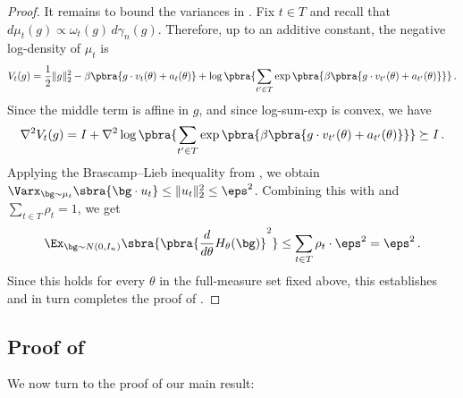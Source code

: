 \documentclass[11pt]{article}
\begin{document}
\begin{proof}
	It remains to bound the variances in .
	Fix $t\in T$ and recall that $d\mu_t(g) \propto \omega_t(g)\, d\gamma_n(g)$. 
	Therefore, up to an additive constant, the negative log-density of $\mu_t$ is
	\[
		V_t(g)
		=
		\frac12\|g\|_2^2
		-
		\beta\pbra{g\cdot v_t(\theta)+a_t(\theta)}
		+
		\log\pbra{
		\sum_{t'\in T}
		\exp\pbra{\beta\pbra{g\cdot v_{t'}(\theta)+a_{t'}(\theta)}}
		}\,.
	\]
	Since the middle term is affine in $g$, and since log-sum-exp is convex, we have
	\[
		\nabla^2 V_t(g)
		=
		I
		+
		\nabla^2
		\log\pbra{
		\sum_{t'\in T}
		\exp\pbra{\beta\pbra{g\cdot v_{t'}(\theta)+a_{t'}(\theta)}}
		}
		\succeq I\,.
	\]
	Applying the Brascamp--Lieb inequality from , we obtain
	$
		\Varx_{\bg\sim\mu_t}\sbra{\bg\cdot u_t}
		\leq
		\|u_t\|_2^2
		\leq
		\eps^2
	$.
	Combining this with  and $\sum_{t\in T}\rho_t=1$, we get
	\[
		\Ex_{\bg\sim N(0,I_n)}
		\sbra{
		\pbra{\frac{d}{d\theta}H_\theta(\bg)}^2
		}
		\leq 
		\sum_{t\in T}\rho_t \cdot \eps^2
		=
		\eps^2\,.
	\]
	Since this holds for every $\theta$ in the full-measure set fixed above, this establishes  and in turn completes the proof of . 
\end{proof} 

\subsection{Proof of~}
\label{subsec:putting-it-all-together} 

We now turn to the proof of our main result: 

\gpsparsificationthm*
\end{document}

